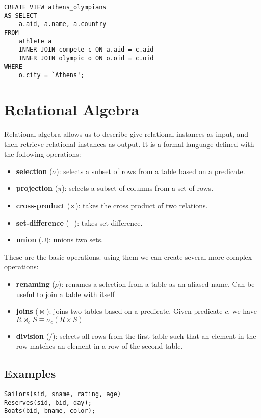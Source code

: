 \documentclass{article}
\begin{document}
\begin{verbatim}
CREATE VIEW athens_olympians
AS SELECT
    a.aid, a.name, a.country
FROM
    athlete a
    INNER JOIN compete c ON a.aid = c.aid
    INNER JOIN olympic o ON o.oid = c.oid
WHERE
    o.city = `Athens';
\end{verbatim}


\section{Relational Algebra}

Relational algebra allows us to describe give relational instances as input, and then retrieve relational instances as output. It is a formal language defined with the following operations:

\begin{itemize}
\item \textbf{selection} ($\sigma$): selects a subset of rows from a table based on a predicate.
\item \textbf{projection} ($\pi$): selects a subset of columns from a set of rows.
\item \textbf{cross-product} ($\times$): takes the cross product of two relations.
\item \textbf{set-difference} ($-$): takes set difference.
\item \textbf{union} ($\cup$): unions two sets.
\end{itemize}

These are the basic operations. using them we can create several more complex operations:

\begin{itemize}
\item \textbf{renaming} ($\rho$): renames a selection from a table as an aliased name. Can be useful to join a table with itself
\item \textbf{joins} ($\bowtie$): joins two tables based on a predicate. Given predicate $c$, we have $R\bowtie_c S \equiv \sigma_c(R\times S)$
\item \textbf{division} ($\slash$): selects all rows from the first table such that an element in the row matches an element in a row of the second table.
\end{itemize}

\subsection{Examples}

\begin{verbatim}
Sailors(sid, sname, rating, age)
Reserves(sid, bid, day);
Boats(bid, bname, color);
\end{verbatim}
\end{document}
